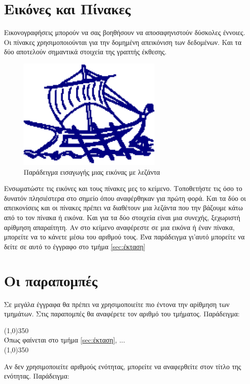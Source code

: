 \section{Εικόνες και Πίνακες}
Εικονογραφήσεις μπορούν να σας βοηθήσουν να αποσαφηνιστούν δύσκολες έννοιες. Οι πίνακες χρησιμοποιούνται για την δομημένη απεικόνιση των δεδομένων. Και τα δύο αποτελούν σημαντικά στοιχεία της γραπτής έκθεσης.

\begin{figure}[htb]
\centering
 \includegraphics[width=70mm]{images/teipirlogo.eps}
\caption{Παράδειγμα εισαγωγής μιας εικόνας με λεζάντα}
\label{figure:teipirlogo}
\end{figure}

Ενσωματώστε τις εικόνες και τους πίνακες μες το κείμενο. Τοποθετήστε τις όσο το δυνατόν πλησιέστερα στο σημείο όπου αναφέρθηκαν για πρώτη φορά. Και τα δύο οι απεικονίσεις και οι πίνακες πρέπει να διαθέτουν μια λεζάντα που την βάζουμε κάτω από το τον πίνακα ή εικόνα. Και για τα δύο στοιχεία είναι μια συνεχής, ξεχωριστή αρίθμηση απαραίτητη. Αν στο κείμενο αναφέρεστε σε μια εικόνα ή έναν πίνακα, μπορείτε να το κάνετε μέσω του αριθμού τους. Ένα παράδειγμα γι'αυτό μπορείτε να δείτε σε αυτό το έγγραφο στο τμήμα \ref{sec:έκταση}

\section{Οι παραπομπές}
Σε μεγάλα έγγραφα θα πρέπει να χρησιμοποιείτε πιο έντονα την αρίθμηση των τμημάτων. Στις παραπομπές θα αναφέρετε τον αριθμό του τμήματος. Παράδειγμα: 

\begin{center}
\line(1,0){350}\\
Όπως φαίνεται στο τμήμα \ref{sec:έκταση},  ... \\
\line(1,0){350}\\
\end{center}

Αν δεν χρησιμοποιείτε αριθμούς ενότητας, μπορείτε να αναφερθείτε στον τίτλο της ενότητας. Παράδειγμα: 

